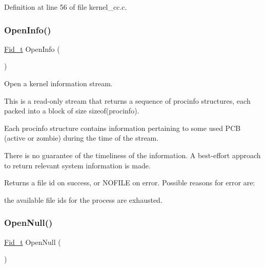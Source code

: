 Definition at line 56 of file kernel\+\_\+cc.\+c.

\mbox{\label{group__syscalls_gaf326b11574cdc84a9e21b9d860076821}} 
\subsubsection{\texorpdfstring{Open\+Info()}{OpenInfo()}}
{\footnotesize\ttfamily \hyperlink{group__syscalls_ga5097222c5f0da97d92d4712359abc38f}{Fid\+\_\+t} Open\+Info (\begin{DoxyParamCaption}{ }\end{DoxyParamCaption})}



Open a kernel information stream. 

This is a read-\/only stream that returns a sequence of {\ttfamily procinfo} structures, each packed into a block of size {\ttfamily sizeof(procinfo)}.

Each procinfo structure contains information pertaining to some used P\+CB (active or zombie) during the time of the stream.

There is no guarantee of the timeliness of the information. A best-\/effort approach to return relevant system information is made.

\begin{DoxyReturn}{Returns}
a file id on success, or N\+O\+F\+I\+LE on error. Possible reasons for error are\+:
\begin{DoxyItemize}
\item the available file ids for the process are exhausted. 
\end{DoxyItemize}
\end{DoxyReturn}
\mbox{\label{group__syscalls_ga39805b4ae668b715fb43f0f1e6ce8c45}} 
\subsubsection{\texorpdfstring{Open\+Null()}{OpenNull()}}
{\footnotesize\ttfamily \hyperlink{group__syscalls_ga5097222c5f0da97d92d4712359abc38f}{Fid\+\_\+t} Open\+Null (\begin{DoxyParamCaption}{ }\end{DoxyParamCaption})}




